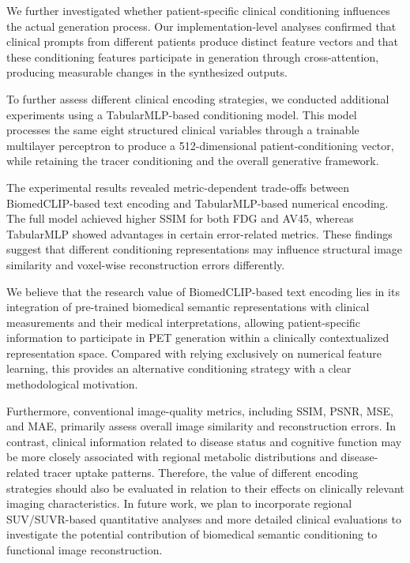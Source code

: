 {We further investigated whether patient-specific clinical conditioning influences the actual generation process. Our implementation-level analyses confirmed that clinical prompts from different patients produce distinct feature vectors and that these conditioning features participate in generation through cross-attention, producing measurable changes in the synthesized outputs.

To further assess different clinical encoding strategies, we conducted additional experiments using a TabularMLP-based conditioning model. This model processes the same eight structured clinical variables through a trainable multilayer perceptron to produce a 512-dimensional patient-conditioning vector, while retaining the tracer conditioning and the overall generative framework.

The experimental results revealed metric-dependent trade-offs between BiomedCLIP-based text encoding and TabularMLP-based numerical encoding. The full model achieved higher SSIM for both FDG and AV45, whereas TabularMLP showed advantages in certain error-related metrics. These findings suggest that different conditioning representations may influence structural image similarity and voxel-wise reconstruction errors differently.

We believe that the research value of BiomedCLIP-based text encoding lies in its integration of pre-trained biomedical semantic representations with clinical measurements and their medical interpretations, allowing patient-specific information to participate in PET generation within a clinically contextualized representation space. Compared with relying exclusively on numerical feature learning, this provides an alternative conditioning strategy with a clear methodological motivation.

Furthermore, conventional image-quality metrics, including SSIM, PSNR, MSE, and MAE, primarily assess overall image similarity and reconstruction errors. In contrast, clinical information related to disease status and cognitive function may be more closely associated with regional metabolic distributions and disease-related tracer uptake patterns. Therefore, the value of different encoding strategies should also be evaluated in relation to their effects on clinically relevant imaging characteristics. In future work, we plan to incorporate regional SUV/SUVR-based quantitative analyses and more detailed clinical evaluations to investigate the potential contribution of biomedical semantic conditioning to functional image reconstruction.

}
